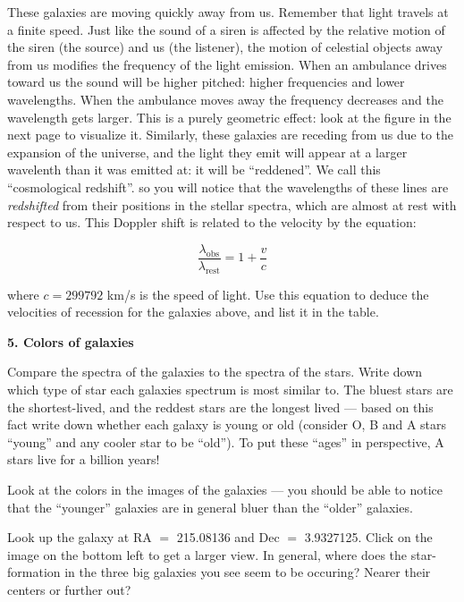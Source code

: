 \begin{figure*}[h]
\centerline{}
 \end{figure*}

\noindent These galaxies are moving quickly away from us. Remember 
that light travels at a finite speed.  Just like the sound of a siren
is affected by the relative motion of the siren (the source) and us
(the listener), the motion of celestial objects away from us modifies
the frequency of the light emission. When an ambulance drives toward
us the sound will be higher pitched: higher frequencies and lower
wavelengths. When the ambulance moves away the frequency decreases and
the wavelength gets larger. This is a purely geometric effect: look at
the figure in the next page to visualize it. Similarly, these galaxies
are receding from us due to the expansion of the universe, and the
light they emit will appear at a larger wavelenth than it was emitted
at: it will be ``reddened''. We call this ``cosmological redshift''.
so you will notice that the wavelengths of these lines are {\it
redshifted} from their positions in the stellar spectra, which are
almost at rest with respect to us. This Doppler shift is related to
the velocity by the equation:

\begin{equation}
\frac{\lambda_{\mathrm{obs}}}
{\lambda_{\mathrm{rest}}} = 1 + \frac{v}{c}
\end{equation}

\noindent where $c=299792$ km/s is the speed of light. Use this
equation to deduce the velocities of recession for the galaxies above,
and list it in the table.

\noindent
{\bf 5. Colors of galaxies}

\noindent Compare the spectra of the galaxies to the spectra of the
stars.  Write down which type of star each galaxies spectrum is most
similar to. The bluest stars are the shortest-lived, and the reddest
stars are the longest lived --- based on this fact write down whether
each galaxy is young or old (consider O, B and A stars ``young'' and
any cooler star to be ``old''). To put these ``ages'' in perspective,
A stars live for a billion years!

\noindent Look at the colors in the images of the galaxies --- you
should be able to notice that the ``younger'' galaxies are in general
bluer than the ``older'' galaxies.

\noindent Look up the galaxy at RA $=$ 215.08136 and Dec $=$
3.9327125. Click on the image on the bottom left to get a larger
view.  In general, where does the star-formation in the three big
galaxies you see seem to be occuring? Nearer their centers or further
out?

